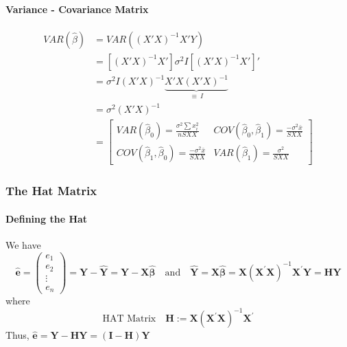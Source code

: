 \documentclass[11pt]{article}
\begin{document}
\paragraph{Variance - Covariance Matrix}
\begin{align*}
    VAR(\hat{\beta}) &= VAR( (X'X)^{-1}X'Y ) \\
    &= [(X'X)^{-1}X'] \sigma^2 I [(X'X)^{-1}X']' \\
    &= \sigma^2 I (X'X)^{-1}  \underbrace{X'X (X'X)^{-1}}_{\equiv~I} \\
    &= \sigma^2 (X'X)^{-1} \\
    &=
    \begin{bmatrix}
        VAR(\hat{\beta}_0) =  \frac{\sigma^2\sum x_{i}^{2}}{n S X X}
        & COV(\hat{\beta}_0, \hat{\beta}_1) = \frac{-\sigma^2\bar{x}}{S X X} \\
        COV(\hat{\beta}_1, \hat{\beta}_0) = \frac{-\sigma^2\bar{x}}{S X X}
        & VAR(\hat{\beta}_1) = \frac{\sigma^2}{SXX}
    \end{bmatrix}
\end{align*}

\subsubsection{The Hat Matrix}
\paragraph{Defining the Hat}
We have
\begin{equation*}
    \widehat{\mathbf{e}}=\left(\begin{array}{c}{e_{1}} \\ {e_{2}} \\ {\vdots} \\ {e_{n}}\end{array}\right)=\mathbf{Y}-\widehat{\mathbf{Y}}=\mathbf{Y}-\mathbf{X} \widehat{\boldsymbol{\beta}} \quad \text{and} \quad  \widehat{\mathbf{Y}}=\mathbf{X} \widehat{\boldsymbol{\beta}}=\mathbf{X}\left(\mathbf{X}^{\prime} \mathbf{X}\right)^{-1} \mathbf{X}^{\prime} \mathbf{Y}=\mathbf{H} \mathbf{Y}
\end{equation*}
where
\begin{equation*}
    \text{HAT Matrix} \quad \mathbf{H} := \mathbf{X}\left(\mathbf{X}^{\prime} \mathbf{X}\right)^{-1} \mathbf{X}^{\prime}
\end{equation*}
Thus, $\widehat{\mathbf{e}}=\mathbf{Y}-\mathbf{H Y}=(\mathbf{I}-\mathbf{H}) \mathbf{Y}$
\end{document}
